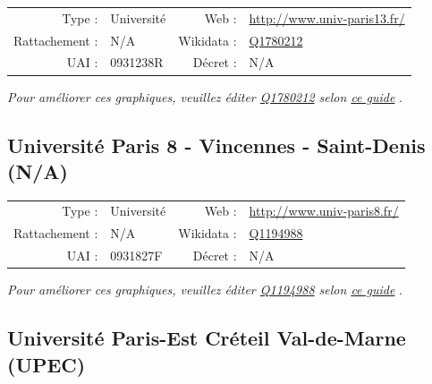 \documentclass[11pt,french,landscape]{article}
\begin{document}
\begin{tabular*}{0.45\textwidth}{rp{2cm}rl}  
\hline  
Type : & Université & Web : &\href{http://www.univ-paris13.fr/}{http://www.univ-paris13.fr/} \\  
Rattachement : & N/A & Wikidata : & \href{https://www.wikidata.org/entity/Q1780212}{Q1780212} \\  
UAI : & 0931238R & Décret : & N/A \\  
\hline  
\end{tabular*}

\textit{\scriptsize Pour améliorer ces graphiques, veuillez éditer \href{https://www.wikidata.org/entity/Q1780212}{Q1780212}  selon \href{https://github.com/cpesr/wikidataESR/blob/master/Rmd/wikidataESR.md}{ce guide}}
.


\newpage

\hypertarget{universituxe9-paris-8---vincennes---saint-denis-na}{%
\subsection{Université Paris 8 - Vincennes - Saint-Denis
(N/A)}\label{universituxe9-paris-8---vincennes---saint-denis-na}}

\begin{tabular*}{0.45\textwidth}{rp{2cm}rl}  
\hline  
Type : & Université & Web : &\href{http://www.univ-paris8.fr/}{http://www.univ-paris8.fr/} \\  
Rattachement : & N/A & Wikidata : & \href{https://www.wikidata.org/entity/Q1194988}{Q1194988} \\  
UAI : & 0931827F & Décret : & N/A \\  
\hline  
\end{tabular*}

\textit{\scriptsize Pour améliorer ces graphiques, veuillez éditer \href{https://www.wikidata.org/entity/Q1194988}{Q1194988}  selon \href{https://github.com/cpesr/wikidataESR/blob/master/Rmd/wikidataESR.md}{ce guide}}
.


\newpage

\hypertarget{universituxe9-paris-est-cruxe9teil-val-de-marne-upec}{%
\subsection{Université Paris-Est Créteil Val-de-Marne
(UPEC)}\label{universituxe9-paris-est-cruxe9teil-val-de-marne-upec}}
\end{document}
